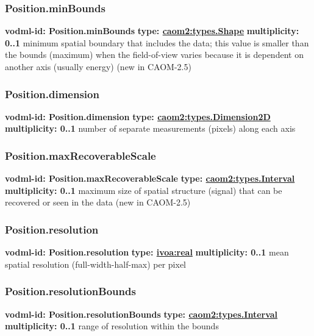     \subsubsection{Position.minBounds}
      \textbf{vodml-id: Position.minBounds} \newline
      \textbf{type: \hyperref[sect:types.Shape]{caom2:types.Shape}} \newline
      \textbf{multiplicity: 0..1} \newline
      minimum spatial boundary that includes the data; this value is smaller than the bounds (maximum) when the field-of-view varies because it is dependent on another axis (usually energy) (new in CAOM-2.5)

    \subsubsection{Position.dimension}
      \textbf{vodml-id: Position.dimension} \newline
      \textbf{type: \hyperref[sect:types.Dimension2D]{caom2:types.Dimension2D}} \newline
      \textbf{multiplicity: 0..1} \newline
      number of separate measurements (pixels) along each axis

    \subsubsection{Position.maxRecoverableScale}
      \textbf{vodml-id: Position.maxRecoverableScale} \newline
      \textbf{type: \hyperref[sect:types.Interval]{caom2:types.Interval}} \newline
      \textbf{multiplicity: 0..1} \newline
      maximum size of spatial structure (signal) that can be recovered or seen in the data (new in CAOM-2.5)

    \subsubsection{Position.resolution}
      \textbf{vodml-id: Position.resolution} \newline
      \textbf{type: \hyperref[sect:ivoa]{ivoa:real}} \newline
      \textbf{multiplicity: 0..1} \newline
      mean spatial resolution (full-width-half-max) per pixel

    \subsubsection{Position.resolutionBounds}
      \textbf{vodml-id: Position.resolutionBounds} \newline
      \textbf{type: \hyperref[sect:types.Interval]{caom2:types.Interval}} \newline
      \textbf{multiplicity: 0..1} \newline
      range of resolution within the bounds

